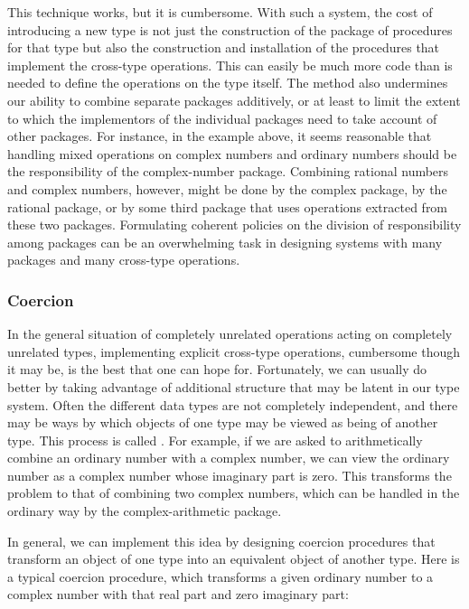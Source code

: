 \noindent
This technique works, but it is cumbersome.  With such a system, the cost of
introducing a new type is not just the construction of the package of
procedures for that type but also the construction and installation of the
procedures that implement the cross-type operations.  This can easily be much
more code than is needed to define the operations on the type itself.  The
method also undermines our ability to combine separate packages additively, or
at least to limit the extent to which the implementors of the individual packages
need to take account of other packages.  For instance, in the example above, it
seems reasonable that handling mixed operations on complex numbers and ordinary
numbers should be the responsibility of the complex-number package.  Combining
rational numbers and complex numbers, however, might be done by the complex
package, by the rational package, or by some third package that uses operations
extracted from these two packages.  Formulating coherent policies on the
division of responsibility among packages can be an overwhelming task in
designing systems with many packages and many cross-type operations.

\subsubsection*{Coercion}

In the general situation of completely unrelated operations acting on
completely unrelated types, implementing explicit cross-type operations,
cumbersome though it may be, is the best that one can hope for.  Fortunately,
we can usually do better by taking advantage of additional structure that may
be latent in our type system.  Often the different data types are not
completely independent, and there may be ways by which objects of one type may
be viewed as being of another type.  This process is called .
For example, if we are asked to arithmetically combine an ordinary number with
a complex number, we can view the ordinary number as a complex number whose
imaginary part is zero.  This transforms the problem to that of combining two
complex numbers, which can be handled in the ordinary way by the
complex-arithmetic package.

In general, we can implement this idea by designing coercion procedures that
transform an object of one type into an equivalent object of another type.
Here is a typical coercion procedure, which transforms a given ordinary number
to a complex number with that real part and zero imaginary part:

